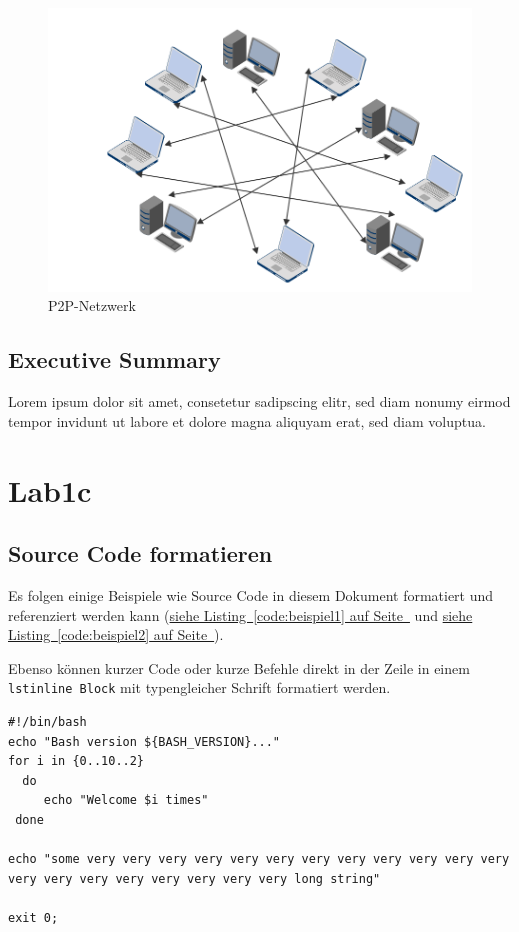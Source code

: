 \documentclass[12pt,a4paper,titlepage,oneside]{scrartcl}
\begin{document}
\begin{figure}[h!]
  \centering
    \includegraphics[width=1.0\textwidth]{./imgs/p2p.png}
  \caption{P2P-Netzwerk}
  \label{fig:p2p}
\end{figure}

\subsection{Executive Summary}
Lorem ipsum dolor sit amet, consetetur sadipscing elitr, sed diam nonumy eirmod tempor invidunt ut labore et dolore magna aliquyam erat, sed diam voluptua. 

\section{Lab1c}

\subsection{Source Code formatieren}
Es folgen einige Beispiele wie Source Code in diesem Dokument formatiert und referenziert werden kann
(\hyperref[code:beispiel1]{siehe Listing~\ref*{code:beispiel1} auf Seite~\pageref*{code:beispiel1}} und \hyperref[code:beispiel2]{siehe Listing~\ref*{code:beispiel2} auf Seite~\pageref*{code:beispiel2}}).

Ebenso können kurzer Code oder kurze Befehle direkt in der Zeile in einem \lstinline{lstinline Block} mit typengleicher Schrift formatiert werden.



\begin{lstlisting}[caption=Example bash script,label=code:beispiel2,style=simple]
#!/bin/bash
echo "Bash version ${BASH_VERSION}..."
for i in {0..10..2}
  do
     echo "Welcome $i times"
 done

echo "some very very very very very very very very very very very very very very very very very very very very long string"

exit 0;
\end{lstlisting}
\end{document}
